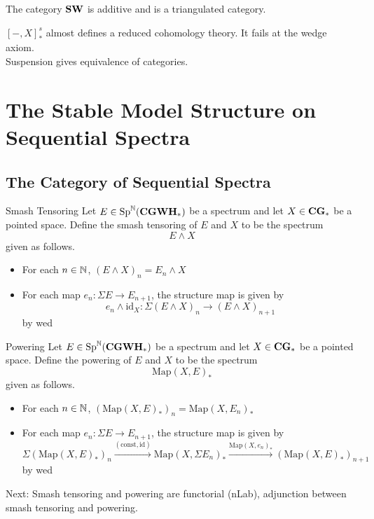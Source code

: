 \documentclass[a4paper]{article}
\begin{document}
\begin{prp}{}{} The category $\bold{SW}$ is additive and is a triangulated category. 
\end{prp}

$[-,X]_\ast^s$ almost defines a reduced cohomology theory. It fails at the wedge axiom. \\
Suspension gives equivalence of categories. 

\pagebreak
\section{The Stable Model Structure on Sequential Spectra}
\subsection{The Category of Sequential Spectra}
\begin{defn}{Smash Tensoring}{} Let $E\in\text{Sp}^{\mathbb{N}}(\bold{CGWH}_\ast)$ be a spectrum and let $X\in\bold{CG}_\ast$ be a pointed space. Define the smash tensoring of $E$ and $X$ to be the spectrum $$E\wedge X$$ given as follows. 
\begin{itemize}
\item For each $n\in\mathbb{N}$, $(E\wedge X)_n=E_n\wedge X$
\item For each map $e_n:\Sigma E\to E_{n+1}$, the structure map is given by $$e_n\wedge\text{id}_X:\Sigma(E\wedge X)_n\to(E\wedge X)_{n+1}$$ by wed
\end{itemize}
\end{defn}

\begin{defn}{Powering}{} Let $E\in\text{Sp}^{\mathbb{N}}(\bold{CGWH}_\ast)$ be a spectrum and let $X\in\bold{CG}_\ast$ be a pointed space. Define the powering of $E$ and $X$ to be the spectrum $$\text{Map}(X,E)_\ast$$ given as follows. 
\begin{itemize}
\item For each $n\in\mathbb{N}$, $(\text{Map}(X,E)_\ast)_n=\text{Map}(X,E_n)_\ast$
\item For each map $e_n:\Sigma E\to E_{n+1}$, the structure map is given by $$\Sigma(\text{Map}(X,E)_\ast)_n\overset{(\text{const},\text{id})}{\longrightarrow}\text{Map}(X,\Sigma E_n)_\ast\overset{\text{Map}(X,e_n)_\ast}{\longrightarrow}(\text{Map}(X,E)_\ast)_{n+1}$$ by wed
\end{itemize}
\end{defn}

Next: Smash tensoring and powering are functorial (nLab), adjunction between smash tensoring and powering. 
\end{document}
